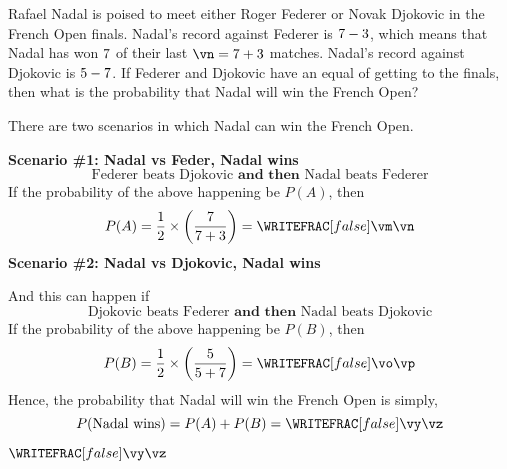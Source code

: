 
\ADD\va\vb\nf
\ADD\vc\vd\nd

\va\nf\vm\vn
{}\vc\nd\vo\vp
\FRACADD\vm\vn\vo\vp\vy\vz

\question[3] Rafael Nadal is poised to meet either Roger Federer or Novak 
Djokovic in the French Open finals. Nadal's record against Federer is 
$7-3$, which means that Nadal has won $7$ of their last $\vn = \va+\vb$ matches. 
Nadal's record against Djokovic is $5-7$. If Federer and Djokovic have an equal 
of getting to the finals, then what is the probability that Nadal will win the French Open?

\watchout

\begin{solution}[\halfpage]
  There are two scenarios in which Nadal can win the French Open. 

  \textbf{Scenario \#1: Nadal vs Feder, Nadal wins}
  \[\text{Federer beats Djokovic }\textbf{and then}\text{ Nadal beats Federer} \]
  If the probability of the above happening be $P(A)$, then 
  \[ P(A) = \dfrac{1}{2}\times\left( \dfrac{\va}{\va+\vb}\right) = \WRITEFRAC[false]\vm\vn \] 
  \textbf{Scenario \#2: Nadal vs Djokovic, Nadal wins}
  
  And this can happen if 
  \[\text{Djokovic beats Federer }\textbf{and then}\text{ Nadal beats Djokovic} \]
  If the probability of the above happening be $P(B)$, then 
  \[ P(B) = \dfrac{1}{2}\times\left(\dfrac{\vc}{\vc+\vd} \right) = \WRITEFRAC[false]\vo\vp \] 
  Hence, the probability that Nadal will win the French Open is simply, 
  \[ P(\text{Nadal wins}) = P(A) + P(B) = \WRITEFRAC[false]\vy\vz \]
\end{solution}
\ifprintanswers\begin{codex}$\WRITEFRAC[false]\vy\vz$\end{codex}\fi
